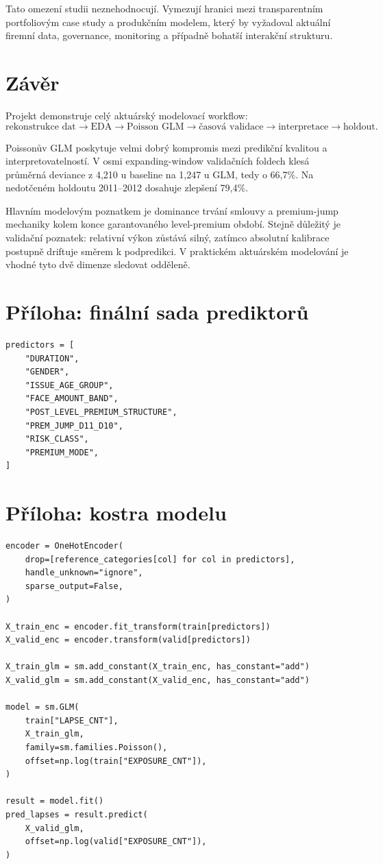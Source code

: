 \documentclass[11pt,a4paper]{article}
\theoremstyle{definition}
\begin{document}
Tato omezení studii neznehodnocují. Vymezují hranici mezi transparentním portfoliovým case study a produkčním modelem, který by vyžadoval aktuální firemní data, governance, monitoring a případně bohatší interakční strukturu.

\section{Závěr}
Projekt demonstruje celý aktuárský modelovací workflow:
\[
\text{rekonstrukce dat} \to \text{EDA} \to \text{Poisson GLM} \to \text{časová validace} \to \text{interpretace} \to \text{holdout}.
\]

Poissonův GLM poskytuje velmi dobrý kompromis mezi predikční kvalitou a interpretovatelností. V osmi expanding-window validačních foldech klesá průměrná deviance z 4,210 u baseline na 1,247 u GLM, tedy o 66,7\%. Na nedotčeném holdoutu 2011--2012 dosahuje zlepšení 79,4\%.

Hlavním modelovým poznatkem je dominance trvání smlouvy a premium-jump mechaniky kolem konce garantovaného level-premium období. Stejně důležitý je validační poznatek: relativní výkon zůstává silný, zatímco absolutní kalibrace postupně driftuje směrem k podpredikci. V praktickém aktuárském modelování je vhodné tyto dvě dimenze sledovat odděleně.

\newpage
\appendix
\section{Příloha: finální sada prediktorů}
\begin{lstlisting}[style=py,caption={Finální sada kategoriálních prediktorů}]
predictors = [
    "DURATION",
    "GENDER",
    "ISSUE_AGE_GROUP",
    "FACE_AMOUNT_BAND",
    "POST_LEVEL_PREMIUM_STRUCTURE",
    "PREM_JUMP_D11_D10",
    "RISK_CLASS",
    "PREMIUM_MODE",
]
\end{lstlisting}

\section{Příloha: kostra modelu}
\begin{lstlisting}[style=py,caption={Poisson GLM s offsetem expozice v počtu pojistek}]
encoder = OneHotEncoder(
    drop=[reference_categories[col] for col in predictors],
    handle_unknown="ignore",
    sparse_output=False,
)

X_train_enc = encoder.fit_transform(train[predictors])
X_valid_enc = encoder.transform(valid[predictors])

X_train_glm = sm.add_constant(X_train_enc, has_constant="add")
X_valid_glm = sm.add_constant(X_valid_enc, has_constant="add")

model = sm.GLM(
    train["LAPSE_CNT"],
    X_train_glm,
    family=sm.families.Poisson(),
    offset=np.log(train["EXPOSURE_CNT"]),
)

result = model.fit()
pred_lapses = result.predict(
    X_valid_glm,
    offset=np.log(valid["EXPOSURE_CNT"]),
)
\end{lstlisting}
\end{document}
